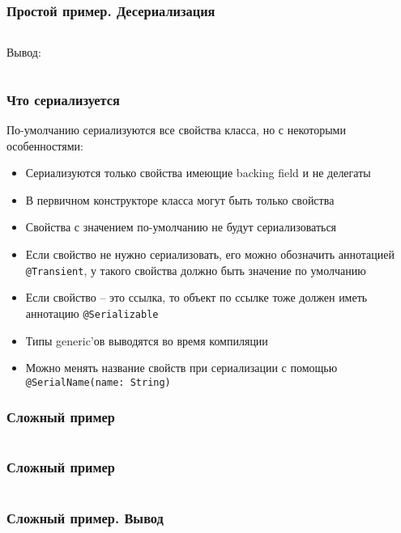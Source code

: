 \documentclass[aspectratio=169]{beamer}
\begin{document}
\begin{frame}[fragile]
    \frametitle{Простой пример. Десериализация}
    \inputminted[]{kotlin}{serialization_examples/serialization2.kt}
    Вывод:
    \inputminted[]{text}{serialization_examples/serialization2.txt}
\end{frame}

\begin{frame}
    \frametitle{Что сериализуется}
    По-умолчанию сериализуются все свойства класса, но с некоторыми особенностями:
    \begin{itemize}
        \item Сериализуются только свойства имеющие backing field и не делегаты
        \item В первичном конструкторе класса могут быть только свойства
        \item Свойства с значением по-умолчанию не будут сериализоваться
        \item Если свойство не нужно сериализовать, его можно обозначить аннотацией \texttt{@Transient}, у такого свойства должно быть значение по умолчанию
        \item Если свойство -- это ссылка, то объект по ссылке тоже должен иметь аннотацию \texttt{@Serializable}
        \item Типы generic'ов выводятся во время компиляции
        \item Можно менять название свойств при сериализации с помощью \texttt{@SerialName(name: String)}
    \end{itemize}
\end{frame}

\begin{frame}[fragile]
    \frametitle{Сложный пример}
    \inputminted[firstline=6, lastline=21]{kotlin}{serialization_examples/hard_example.kt}
\end{frame}
\begin{frame}[fragile]
    \frametitle{Сложный пример}
    \inputminted[firstline=23, lastline=34]{kotlin}{serialization_examples/hard_example.kt}
\end{frame}
\begin{frame}[fragile]
    \frametitle{Сложный пример. Вывод}
    \inputminted[fontsize=\small]{json}{serialization_examples/hard_example.json}
\end{frame}
\end{document}
